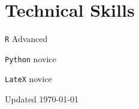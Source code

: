 \documentclass[12pt,letterpaper]{report}
\newcommand{\listitemspace}{0.15em}
\renewenvironment{itemize}
{\begin{list}{}{\setlength{\leftmargin}{0em}
            \setlength{\parskip}{0em}
            \setlength{\itemsep}{\listitemspace}
            \setlength{\parsep}{\listitemspace}}}
    {\end{list}}
\begin{document}
    \section*{Technical Skills}

    \begin{itemize}

        \item \texttt{R} \tab Advanced
        
        \item \texttt{Python} \tab novice

        \item \texttt{LateX} \tab novice
        
    \end{itemize}

    \begin{center}
        \vfill
        Updated \monthyeardate\today
    \end{center}
\end{document}
